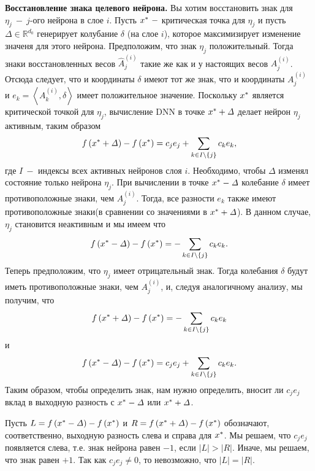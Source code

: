 \textbf{Восстановление знака целевого нейрона.} Вы хотим восстановить знак для $\eta_{j} ~-~j$-ого нейрона в слое $i$. Пусть $\mathnormal{x}^{*} ~-$ критическая точка для $\eta_{j}$ и пусть $\mathit{\Delta} \in \mathbb{R}^{d_{0}}$ генерирует колубание $\delta$ (на слое $i$), которое максимизирует изменение значеня для этого нейрона. Предположим, что знак $\eta_{j}$ положительный. Тогда знаки восстановленных весов $\hat{A}_{j}^{\left(i\right)}$ такие же  как и у настоящих весов  ${A}_{j}^{\left(i\right)}$. Отсюда следует, что и координаты $\delta$ имеют тот же знак, что и координаты  ${A}_{j}^{\left(i\right)}$ и $e_{k} = \left \langle {A}_{k}^{\left(i\right)}, \delta \right \rangle$ имеет положительное значение. Поскольку $\mathnormal{x}^{*}$ является критической точкой для $\eta_{j}$, вычисление DNN в точке $\mathnormal{x}^{*} + \mathit{\Delta}$ делает нейрон $\eta_{j}$ активным, таким образом
$$\mathnormal{f}\left(\mathnormal{x}^{*} + \mathit{\Delta}\right) - \mathnormal{f}\left(\mathnormal{x}^{*}\right) = c_{j} e_{j} + \sum_{k \in I \setminus \{j\}} {c_{k} e_{k}},$$
где $I ~-$ индексы всех активных нейронов слоя $i$. Необходимо, чтобы $\mathit{\Delta}$ изменял состояние только нейрона $\eta_{j}$. При вычислении в точке $\mathnormal{x}^{*} - \mathit{\Delta}$ колебание $\delta$ имеет противоположные знаки, чем ${A}_{j}^{\left(i\right)}$. Тогда, все разности $e_{k}$ также имеют противоположные знаки(в сравнении со значениями в $\mathnormal{x}^{*} + \mathit{\Delta}$). В данном случае, $\eta_{j}$ становится неактивным и мы имеем что
$$\mathnormal{f}\left(\mathnormal{x}^{*} - \mathit{\Delta}\right) - \mathnormal{f}\left(\mathnormal{x}^{*}\right) = - \sum_{k \in I \setminus \{j\}} {c_{k} e_{k}}.$$
Теперь предположим, что $\eta_{j}$ имеет отрицательный знак. Тогда колебания $\delta$ будут иметь противоположные знаки, чем  ${A}_{j}^{\left(i\right)}$, и, следуя аналогичному анализу, мы получим, что 
$$\mathnormal{f}\left(\mathnormal{x}^{*} + \mathit{\Delta}\right) - \mathnormal{f}\left(\mathnormal{x}^{*}\right) = - \sum_{k \in I \setminus \{j\}} {c_{k} e_{k}}$$
и
$$\mathnormal{f}\left(\mathnormal{x}^{*} - \mathit{\Delta}\right) - \mathnormal{f}\left(\mathnormal{x}^{*}\right) = c_{j} e_{j} + \sum_{k \in I \setminus \{j\}} {c_{k} e_{k}}.$$
Таким образом, чтобы определить знак, нам нужно определить, вносит ли $c_{j} e_{j}$ вклад в выходную разность с $\mathnormal{x}^{*} - \mathit{\Delta}$ или $\mathnormal{x}^{*} + \mathit{\Delta}$.

Пусть $L = \mathnormal{f}\left(\mathnormal{x}^{*} - \mathit{\Delta}\right) - \mathnormal{f}\left(\mathnormal{x}^{*}\right)$ и $R = \mathnormal{f}\left(\mathnormal{x}^{*} + \mathit{\Delta}\right) - \mathnormal{f}\left(\mathnormal{x}^{*}\right)$ обозначают, соответственно, выходную разность слева и справа для $\mathnormal{x}^{*}$. Мы решаем, что $c_{j} e_{j}$ появляется слева, т.е. знак нейрона равен $-1$, если $|L|>|R|$. Иначе, мы решаем, что знак равен $+1$.  Так как $c_{j} e_{j} \not = 0$, то невозможно, что $|L|=|R|$.

